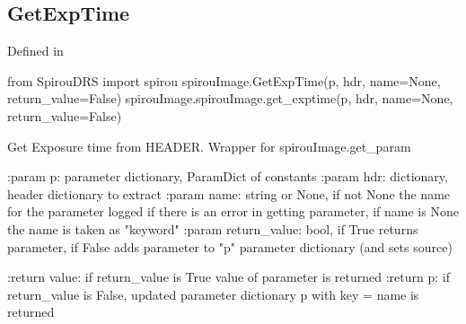 \begin{minipage}{\textwidth}
\subsection{GetExpTime}

Defined in \spirouImage{}

\begin{pythonbox}
from SpirouDRS import spirou
spirouImage.GetExpTime(p, hdr, name=None, return_value=False)
spirouImage.spirouImage.get_exptime(p, hdr, name=None, return_value=False)
\end{pythonbox}

\begin{pythondocstring}
Get Exposure time from HEADER. Wrapper for spirouImage.get_param

:param p: parameter dictionary, ParamDict of constants
:param hdr: dictionary, header dictionary to extract
:param name: string or None, if not None the name for the parameter
             logged if there is an error in getting parameter, if name is
             None the name is taken as "keyword"
:param return_value: bool, if True returns parameter, if False adds
                     parameter to "p" parameter dictionary (and sets source)

:return value: if return_value is True value of parameter is returned
:return p: if return_value is False, updated parameter dictionary p with
           key = name is returned
\end{pythondocstring}
\end{minipage}


